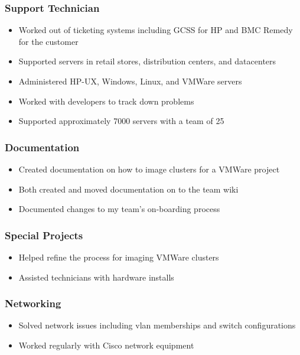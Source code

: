 \documentclass[10pt]{article}
\begin{document}
\subsubsection*{Support Technician}
\begin{itemize}
    \item Worked out of ticketing systems including GCSS for HP and BMC Remedy for the customer
    \item Supported servers in retail stores, distribution centers, and datacenters
    \item Administered HP-UX, Windows, Linux, and VMWare servers
    \item Worked with developers to track down problems
    \item Supported approximately 7000 servers with a team of 25
\end{itemize}

\subsubsection*{Documentation}
\begin{itemize}
    \item Created documentation on how to image clusters for a VMWare project
    \item Both created and moved documentation on to the team wiki
    \item Documented changes to my team's on-boarding process
\end{itemize}

\subsubsection*{Special Projects}
\begin{itemize}
    \item Helped refine the process for imaging VMWare clusters
    \item Assisted technicians with hardware installs
\end{itemize}

\subsubsection*{Networking}
\begin{itemize}
    \item Solved network issues including vlan memberships and switch configurations
    \item Worked regularly with Cisco network equipment
\end{itemize}
\end{document}
